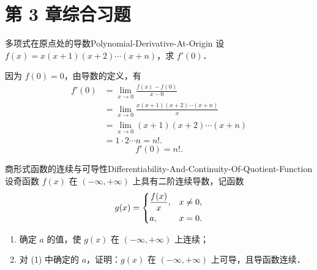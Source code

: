 \section{第 3 章综合习题}

\begin{problem}{多项式在原点处的导数}{Polynomial-Derivative-At-Origin}
    设 $f(x) = x(x + 1)(x + 2)\cdots(x + n)$，求 $f'(0)$．
\end{problem}

\begin{solution}
    因为 $f(0) = 0$，由导数的定义，有
    \begin{equation}
        \begin{aligned}
            f'(0) & = \lim_{x\to 0} \frac{f(x) - f(0)}{x - 0}              \\
                  & = \lim_{x\to 0} \frac{x(x + 1)(x + 2)\cdots(x + n)}{x} \\
                  & = \lim_{x\to 0} (x + 1)(x + 2)\cdots(x + n)            \\
                  & = 1 \cdot 2 \cdots n = n!.
        \end{aligned}
    \end{equation}
    \begin{equation}
        \boxed{f'(0) = n!.}
    \end{equation}
\end{solution}

\begin{problem}{商形式函数的连续与可导性}{Differentiability-And-Continuity-Of-Quotient-Function}
    设奇函数 $f(x)$ 在 $(-\infty, +\infty)$ 上具有二阶连续导数，记函数
    \begin{equation}
        g(x) = \begin{dcases} \frac{f(x)}{x}, & x \neq 0, \\ a, & x = 0. \end{dcases}
    \end{equation}
    \begin{enumerate}
        \item 确定 $a$ 的值，使 $g(x)$ 在 $(-\infty, +\infty)$ 上连续；
        \item 对 (1) 中确定的 $a$，证明：$g(x)$ 在 $(-\infty, +\infty)$ 上可导，且导函数连续．
    \end{enumerate}
\end{problem}

